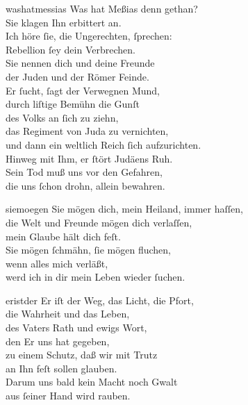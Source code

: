 \documentclass[tocstyle=ref-genre]{ees}
\begin{document}
{  \begin{movement}{washatmessias}
    \voice[Tenore]
    Was hat Meßias denn gethan?\\
    Sie klagen Ihn erbittert an.\\
    Ich höre ſie, die Ungerechten, ſprechen:\\
    Rebellion ſey dein Verbrechen.\\
    Sie nennen dich und deine Freunde\\
    der Juden und der Römer Feinde.\\
    Er ſucht, ſagt der Verwegnen Mund,\\
    durch liſtige Bemühn die Gunſt\\
    des Volks an ſich zu ziehn,\\
    das Regiment von Juda zu vernichten,\\
    und dann ein weltlich Reich ſich aufzurichten.\\
    Hinweg mit Ihm, er ſtört Judäens Ruh.\\
    Sein Tod muß uns vor den Gefahren,\\
    die uns ſchon drohn, allein bewahren.
  \end{movement}

  \begin{movement}{siemoegen}
    \voice[Tenore]
    Sie mögen dich, mein Heiland, immer haſſen,\\
    die Welt und Freunde mögen dich verlaſſen,\\
    mein Glaube hält dich feſt.\\[1ex]
    Sie mögen ſchmähn, ſie mögen fluchen,\\
    wenn alles mich verläßt,\\
    werd ich in dir mein Leben wieder ſuchen.
  \end{movement}

  \begin{movement}{eristder}
    \voice[Coro]
    Er iſt der Weg, das Licht, die Pfort,\\
    die Wahrheit und das Leben,\\
    des Vaters Rath und ewigs Wort,\\
    den Er uns hat gegeben,\\
    zu einem Schutz, daß wir mit Trutz\\
    an Ihn feſt sollen glauben.\\
    Darum uns bald kein Macht noch Gwalt\\
    aus ſeiner Hand wird rauben.
  \end{movement}

}
\end{document}

